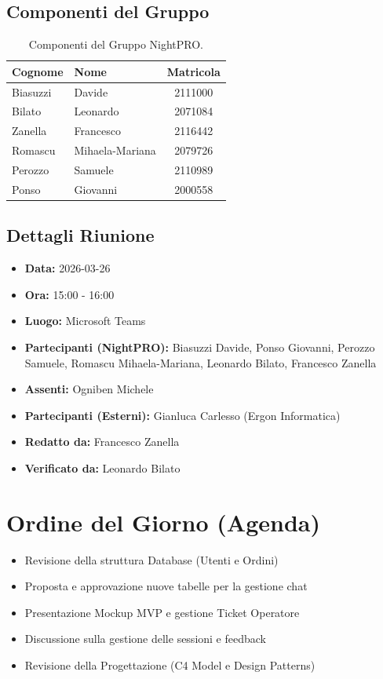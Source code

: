 \documentclass[a4paper, 11pt, oneside]{scrartcl} %
\begin{document}
\subsection{Componenti del Gruppo}
\begin{table}[h!]
\centering
\begin{tabular}{@{}llc@{}}
\toprule
\textbf{Cognome} & \textbf{Nome} & \textbf{Matricola} \\
\midrule
Biasuzzi & Davide & 2111000 \\
Bilato & Leonardo & 2071084 \\
Zanella & Francesco & 2116442 \\
Romascu & Mihaela-Mariana & 2079726 \\
Perozzo & Samuele & 2110989 \\
Ponso & Giovanni & 2000558 \\
\bottomrule
\end{tabular}
\caption{Componenti del Gruppo NightPRO.}
\end{table}

\subsection{Dettagli Riunione}
\begin{itemize}
    \item \textbf{Data:} 2026-03-26
    \item \textbf{Ora:} 15:00 - 16:00
    \item \textbf{Luogo:} Microsoft Teams
    \item \textbf{Partecipanti (NightPRO):} Biasuzzi Davide, Ponso Giovanni, Perozzo Samuele, Romascu Mihaela-Mariana, Leonardo Bilato, Francesco Zanella
    \item \textbf{Assenti:} Ogniben Michele
    \item \textbf{Partecipanti (Esterni):} Gianluca Carlesso (Ergon Informatica)
    \item \textbf{Redatto da: } Francesco Zanella
    \item \textbf{Verificato da:} Leonardo Bilato
\end{itemize}

\newpage
\section{Ordine del Giorno (Agenda)}
\begin{itemize}
    \item[1.] Revisione della struttura Database (Utenti e Ordini)
    \item[2.] Proposta e approvazione nuove tabelle per la gestione chat
    \item[3.] Presentazione Mockup MVP e gestione Ticket Operatore
    \item[4.] Discussione sulla gestione delle sessioni e feedback
    \item[5.] Revisione della Progettazione (C4 Model e Design Patterns)
\end{itemize}
\end{document}
